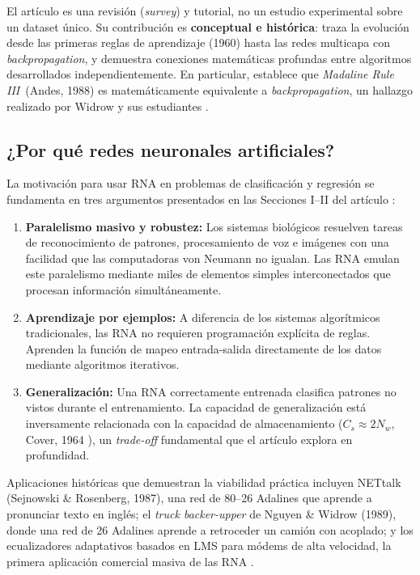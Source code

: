\documentclass[11pt,a4paper]{article}
\newcommand{\bp}{\textit{backpropagation}}
\newcommand{\mriii}{\textit{Madaline Rule III}}
\begin{document}
El artículo es una revisión (\textit{survey}) y tutorial, no un estudio experimental sobre un
dataset único. Su contribución es \textbf{conceptual e histórica}: traza la evolución desde las
primeras reglas de aprendizaje (1960) hasta las redes multicapa con \bp, y demuestra conexiones
matemáticas profundas entre algoritmos desarrollados independientemente. En particular, establece
que \mriii~(Andes, 1988) es matemáticamente equivalente a \bp, un hallazgo realizado por Widrow
y sus estudiantes \cite{widrow1990}.

\subsection{¿Por qué redes neuronales artificiales?}

La motivación para usar RNA en problemas de clasificación y regresión se fundamenta en tres
argumentos presentados en las Secciones I--II del artículo \cite{widrow1990}:

\begin{enumerate}[label=\textbf{(\roman*)},leftmargin=*]
    \item \textbf{Paralelismo masivo y robustez:} Los sistemas biológicos resuelven tareas de
    reconocimiento de patrones, procesamiento de voz e imágenes con una facilidad que las
    computadoras von Neumann no igualan. Las RNA emulan este paralelismo mediante miles de
    elementos simples interconectados que procesan información simultáneamente.
    \item \textbf{Aprendizaje por ejemplos:} A diferencia de los sistemas algorítmicos
    tradicionales, las RNA no requieren programación explícita de reglas. Aprenden la función
    de mapeo entrada-salida directamente de los datos mediante algoritmos iterativos.
    \item \textbf{Generalización:} Una RNA correctamente entrenada clasifica patrones no vistos
    durante el entrenamiento. La capacidad de generalización está inversamente relacionada con la
    capacidad de almacenamiento ($C_s \approx 2N_w$, Cover, 1964 \cite{cover1965}), un
    \textit{trade-off} fundamental que el artículo explora en profundidad.
\end{enumerate}

Aplicaciones históricas que demuestran la viabilidad práctica incluyen NETtalk (Sejnowski \&
Rosenberg, 1987), una red de 80--26 Adalines que aprende a pronunciar texto en inglés; el
\textit{truck backer-upper} de Nguyen \& Widrow (1989), donde una red de 26 Adalines aprende a
retroceder un camión con acoplado; y los ecualizadores adaptativos basados en LMS para módems
de alta velocidad, la primera aplicación comercial masiva de las RNA \cite{widrow1990}.
\end{document}
